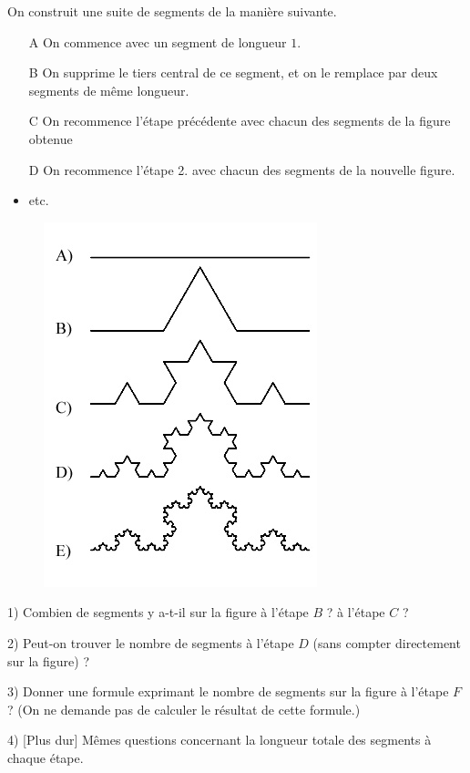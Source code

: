 \documentclass[12 pt]{article}
\theoremstyle{plain}
\newcounter{n}
\numberwithin{n}{section}
\begin{document}
On construit une suite de segments de la manière suivante. \begin{itemize}
\item[A] On commence avec un segment de longueur $1$. 
\item[B] On supprime le tiers central de ce segment, et on le remplace par deux segments de même longueur.
\item[C] On recommence l'étape précédente avec chacun des segments de la figure obtenue
\item[D] On recommence l'étape 2. avec chacun des segments de la nouvelle figure. 
\item etc. 
\end{itemize}
\begin{figure}[H]\center
\includegraphics[scale=.75]{Droite_koch}
\end{figure}

1) Combien de segments y a-t-il sur la figure à l'étape $B$ ? à l'étape $C$ ? 

2) Peut-on trouver le nombre de segments à l'étape $D$ (sans compter directement sur la figure) ?

3) Donner une formule exprimant le nombre de segments sur la figure à l'étape $F$ ? (On ne demande pas de calculer le résultat de cette formule.) 

4) [Plus dur] Mêmes questions concernant la longueur totale des segments à chaque étape. 
	
\end{document}
